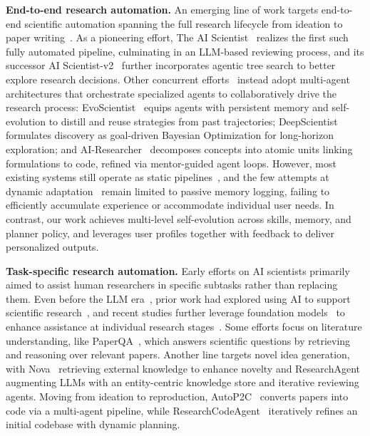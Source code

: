 \documentclass{opendatalab}
\begin{document}
\noindent\textbf{End-to-end research automation.} An emerging line of work targets end-to-end scientific automation spanning the full research lifecycle from ideation to paper writing~\cite{lu2024ai, yamada2025ai, tang2025ai, lyu2026evoscientist, weng2025deepscientist, yang2023ai, xie2025empirical}. As a pioneering effort, The AI Scientist~\cite{lu2024ai} realizes the first such fully automated pipeline, culminating in an LLM-based reviewing process, and its successor AI Scientist-v2~\cite{yamada2025ai} further incorporates agentic tree search to better explore research decisions. Other concurrent efforts~\cite{tang2025ai, lyu2026evoscientist, weng2025deepscientist, yang2023ai, xie2025empirical} instead adopt multi-agent architectures that orchestrate specialized agents to collaboratively drive the research process: EvoScientist~\cite{lyu2026evoscientist} equips agents with persistent memory and self-evolution to distill and reuse strategies from past trajectories; DeepScientist~\cite{weng2025deepscientist} formulates discovery as goal-driven Bayesian Optimization for long-horizon exploration; and AI-Researcher~\cite{tang2025ai} decomposes concepts into atomic units linking formulations to code, refined via mentor-guided agent loops. However, most existing systems still operate as static pipelines~\cite{lu2024ai, yamada2025ai, tang2025ai}, and the few attempts at dynamic adaptation~\cite{lyu2026evoscientist} remain limited to passive memory logging, failing to efficiently accumulate experience or accommodate individual user needs. In contrast, our work achieves multi-level self-evolution across skills, memory, and planner policy, and leverages user profiles together with feedback to deliver personalized outputs.

\noindent\textbf{Task-specific research automation.} Early efforts on AI scientists primarily aimed to assist human researchers in specific subtasks rather than replacing them. Even before the LLM era~\cite{touvron2023llama, bai2023qwen, guo2025deepseek, jiang2024mixtral}, prior work had explored using AI to support scientific research~\cite{lee2020biobert, cachola2020tldr, huang2019clinicalbert, beltagy2019scibert, clune2019ai}, and recent studies further leverage foundation models~\cite{team2025kimi, bai2025qwen3} to enhance assistance at individual research stages~\cite{shao2025omniscientist, team2025internagent}. Some efforts focus on literature understanding, like PaperQA~\cite{lála2023paperqaretrievalaugmentedgenerativeagent}, which answers scientific questions by retrieving and reasoning over relevant papers. Another line targets novel idea generation, with Nova~\cite{hu2024nova} retrieving external knowledge to enhance novelty and ResearchAgent~\cite{baek2025researchagent} augmenting LLMs with an entity-centric knowledge store and iterative reviewing agents. Moving from ideation to reproduction, AutoP2C~\cite{lin2025autop2c} converts papers into code via a multi-agent pipeline, while ResearchCodeAgent~\cite{gandhi2025researchcodeagent} iteratively refines an initial codebase with dynamic planning.
\end{document}
